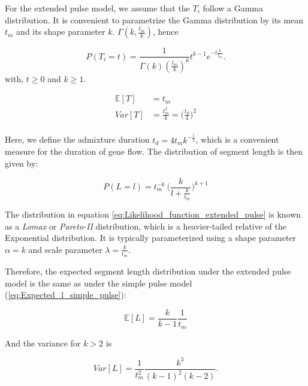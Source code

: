 \documentclass[]{article}
\begin{document}
For the extended pulse model, we assume that the $T_i$ follow a Gamma distribution. It is convenient to parametrize the Gamma distribution by its mean $t_m$ and its shape parameter $k$.  $\Gamma(k,\frac{t_m}{k})$, hence


\begin{equation}
\label{eq:RV_extended_pulse}
  P(T_i=t)=\frac{1}{\Gamma(k)(\frac{t_m}{k})^k}t^{k-1}e^{-t\frac{k}{t_m}}.
\end{equation} 
with, $t \geq 0$ and $k \geq 1$.

\begin{equation}
\begin{split}
\label{eq:RV_extended_pulse_properties}
\mathbb{E}[T]&=t_{m} \\
Var[T]&=\frac{t_{m}^2}{k} = \bigg(\frac{t_d}{4} \bigg)^2  \\
\end{split}
\end{equation}

Here, we define the admixture duration $t_d=4t_m k^{-\frac{1}{2}} $, which is a convenient measure for the duration of gene flow. The distribution of segment length is then given by:


\begin{equation}
\label{eq:Likelihood_function_extended_pulse}
    P(L=l) = t_{m}^{-k} \ \Bigg( \frac{k}{l+\frac{k}{t_{m}}}\Bigg)^{k+1}
\end{equation}

The distribution  in equation \ref{eq:Likelihood_function_extended_pulse} is known as a \emph{Lomax} or \emph{Pareto-II} distribution, which is a heavier-tailed relative of the Exponential distribution. It is typically parameterized using a shape parameter $\alpha=k$ and scale parameter $\lambda = \frac{k}{t_m}$. 


Therefore, the expected segment length distribution under the extended pulse model is the same as under the simple pulse model (\ref{eq:Expected_l_simple_pulse}):

\begin{equation}
\label{eq:Expected_l_extended_pulse}
\mathbb{E}[L] = \frac{k}{k-1}\frac{1}{t_{m}}
\end{equation}

And the variance for $k>2$ is 

\begin{equation}
\label{eq:Var_l_extended_pulse}
Var[L] = \frac{1}{t_m^2}\frac{k^3}{(k-1)^2(k-2)}\text{.}
\end{equation}
\end{document}
